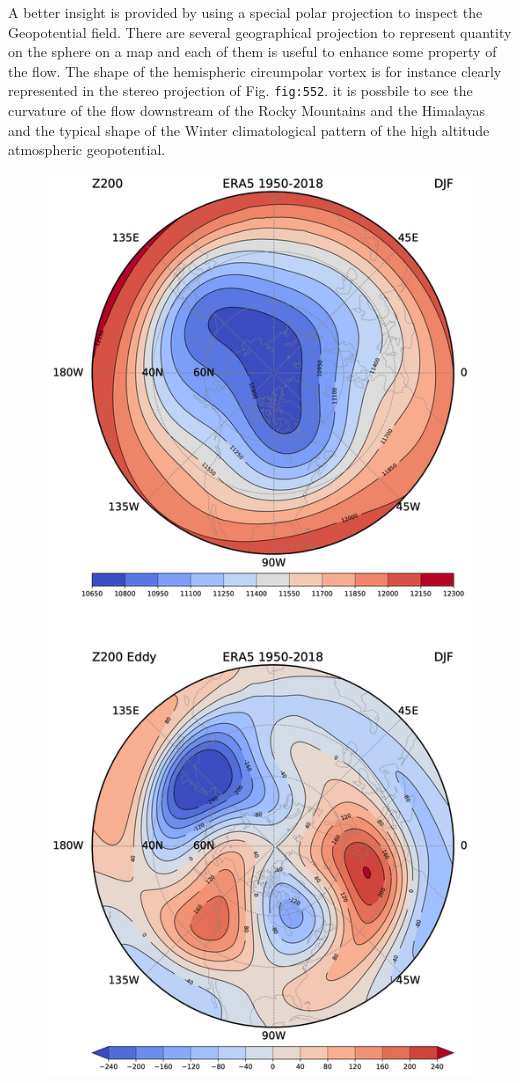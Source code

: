 A better insight is provided by using a special polar projection to
inspect the Geopotential field. There are several geographical
projection to represent quantity on the sphere on a map and each of them
is useful to enhance some property of the flow. The shape of the
hemispheric circumpolar vortex is for instance clearly represented in
the stereo projection of Fig. \texttt{fig:552}. it is possbile to see
the curvature of the flow downstream of the Rocky Mountains and the
Himalayas and the typical shape of the Winter climatological pattern of
the high altitude atmospheric geopotential.

\begin{figure}
\centering
\includegraphics[width = .7 \textwidth]{figs/GD/Z200NH.png}
\caption{}\label{}
\end{figure}

